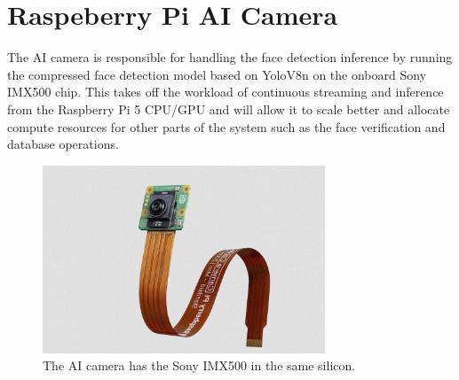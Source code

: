 \section{Raspeberry Pi AI Camera}
The AI camera is responsible for handling the face detection inference by running the compressed face detection model based on YoloV8n on the onboard Sony IMX500 chip. This takes off the workload of continuous streaming and inference from the Raspberry Pi 5 CPU/GPU and will allow it to scale better and allocate compute resources for other parts of the system such as the face verification and database operations.
\begin{figure}[h] %
	\centering
	\includegraphics[width=0.75\textwidth]{figures/chapter4/ai_cam.png} %
	\caption{The AI camera has the Sony IMX500 in the same silicon.}
	\label{fig:ai_cam}
\end{figure}
